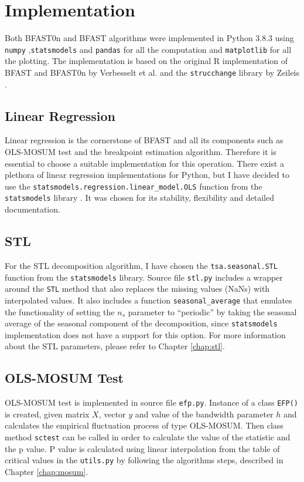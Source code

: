 \documentclass[main.tex]{subfiles}
\begin{document}
\chapter{Implementation}
\label{chap:implementation}
Both BFAST0n and BFAST algorithms were implemented in Python 3.8.3 using
\texttt{numpy} \cite{numpy},\texttt{statsmodels} \cite{statsmodels} and
\texttt{pandas}\cite{pandas} for all the computation and \texttt{matplotlib} for
all the plotting. The implementation is based on the original R implementation
of BFAST and BFAST0n by Verbesselt et al. \cite{bfast-github} and the
\texttt{strucchange} library by Zeileis \cite{strucchange_code}.

\section{Linear Regression}
\label{sec:linear_regression}
Linear regression is the cornerstone of BFAST and all its components such as
OLS-MOSUM test and the breakpoint estimation algorithm. Therefore it is
essential to choose a suitable implementation for this operation. There exist a
plethora of linear regression implementations for Python, but I have decided to
use the \texttt{statsmodels.regression.linear\_model.OLS} function from the
\texttt{statsmodels} library \cite{statsmodels}. It was chosen for its
stability, flexibility and detailed documentation.

\section{STL}
\label{sec:impl_stl}
For the STL decomposition algorithm, I have chosen the \texttt{tsa.seasonal.STL} function
from the \texttt{statsmodels} library. Source file \texttt{stl.py} includes a
wrapper around the \texttt{STL} method that also replaces the missing values
(NaNs) with interpolated values. It also includes a function 
\texttt{seasonal\_average} that emulates the functionality of
setting the $n_s$ parameter to ``periodic'' by taking the seasonal average of
the seasonal component of the decomposition, since \texttt{statsmodels}
implementation does not have a support for this option. For more information
about the STL parameters, please refer to Chapter \ref{chap:stl}.

\section{OLS-MOSUM Test}
\label{sec:impl_mosum}
OLS-MOSUM test is implemented in source file \texttt{efp.py}. Instance of a class \texttt{EFP()}
is created, given matrix $X$, vector $y$ and value of the bandwidth parameter
$h$ and calculates the empirical fluctuation process of type OLS-MOSUM. Then
class method \texttt{sctest} can be called in order to calculate the value of the
statistic and the p value. P value is calculated using linear interpolation from the table of critical
values in the \texttt{utils.py} by following the algorithms steps, described in
Chapter \ref{chap:mosum}.
\end{document}
